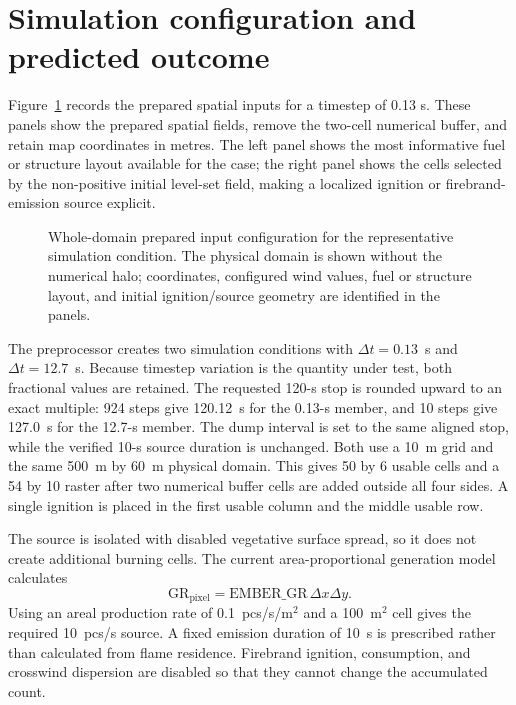 \section{Simulation configuration and predicted outcome}

Figure~\ref{fig:input-configuration} records the prepared spatial inputs for a timestep of 0.13 s.
These panels show the prepared spatial fields, remove the
two-cell numerical buffer, and retain map coordinates in metres.  The left panel shows
the most informative fuel or structure layout available for the case; the right panel
shows the cells selected by the non-positive initial level-set field, making a localized
ignition or firebrand-emission source explicit.

\begin{figure}[H]
\centering
{}
\caption{Whole-domain prepared input configuration for the representative simulation condition.  The
physical domain is shown without the numerical halo; coordinates, configured wind values,
fuel or structure layout, and initial ignition/source geometry are identified in the panels.}
\label{fig:input-configuration}
\end{figure}

The preprocessor creates two simulation conditions with $\Delta t=0.13$~s and
$\Delta t=12.7$~s. Because timestep variation is the quantity under test, both fractional values are retained. The requested 120-s stop is rounded upward to an exact multiple: 924 steps give 120.12~s for the 0.13-s member, and 10 steps give 127.0~s for the 12.7-s member. The dump interval is set to the same aligned stop, while the verified 10-s source duration is unchanged. Both use a 10~m grid and the same 500~m by 60~m physical
domain. This gives 50 by 6 usable cells and a 54 by 10 raster after two numerical buffer cells are added outside all four sides. A single
ignition is placed in the first usable column and the middle usable row.

The source is isolated with disabled vegetative surface spread, so it does not
create additional burning cells. The current area-proportional generation
model calculates
\[
  \mathrm{GR}_{\mathrm{pixel}}
  =\mathrm{EMBER\_GR}\,\Delta x\Delta y.
\]
Using an areal production rate of 0.1~pcs/s/m$^2$ and a 100~m$^2$ cell gives the
required 10~pcs/s source. A fixed emission duration of 10~s is prescribed rather
than calculated from flame residence. Firebrand ignition, consumption, and crosswind
dispersion are disabled so that they cannot change the accumulated count.

